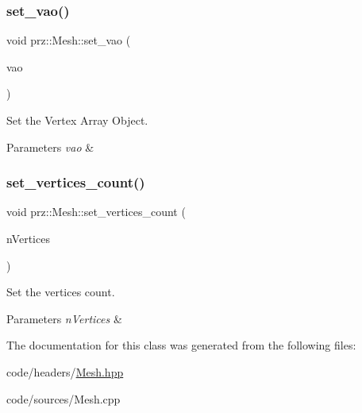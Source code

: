 \subsubsection{\texorpdfstring{set\_vao()}{set\_vao()}}
{\footnotesize\ttfamily void prz\+::\+Mesh\+::set\+\_\+vao (\begin{DoxyParamCaption}\item[{P\+S\+Ptr$<$ \mbox{\hyperlink{classprz_1_1_vertex___array___object}{Vertex\+\_\+\+Array\+\_\+\+Object}} $>$}]{vao }\end{DoxyParamCaption})\hspace{0.3cm}{\ttfamily [inline]}}



Set the Vertex Array Object. 


\begin{DoxyParams}{Parameters}
{\em vao} & \\
\hline
\end{DoxyParams}
\mbox{\label{classprz_1_1_mesh_adc1085f2b12d870bc1ce3c2378d6e25e}} 
\subsubsection{\texorpdfstring{set\_vertices\_count()}{set\_vertices\_count()}}
{\footnotesize\ttfamily void prz\+::\+Mesh\+::set\+\_\+vertices\+\_\+count (\begin{DoxyParamCaption}\item[{G\+Lsizei}]{n\+Vertices }\end{DoxyParamCaption})\hspace{0.3cm}{\ttfamily [inline]}}



Set the vertices count. 


\begin{DoxyParams}{Parameters}
{\em n\+Vertices} & \\
\hline
\end{DoxyParams}


The documentation for this class was generated from the following files\+:\begin{DoxyCompactItemize}
\item 
code/headers/\mbox{\hyperlink{_mesh_8hpp}{Mesh.\+hpp}}\item 
code/sources/Mesh.\+cpp\end{DoxyCompactItemize}
